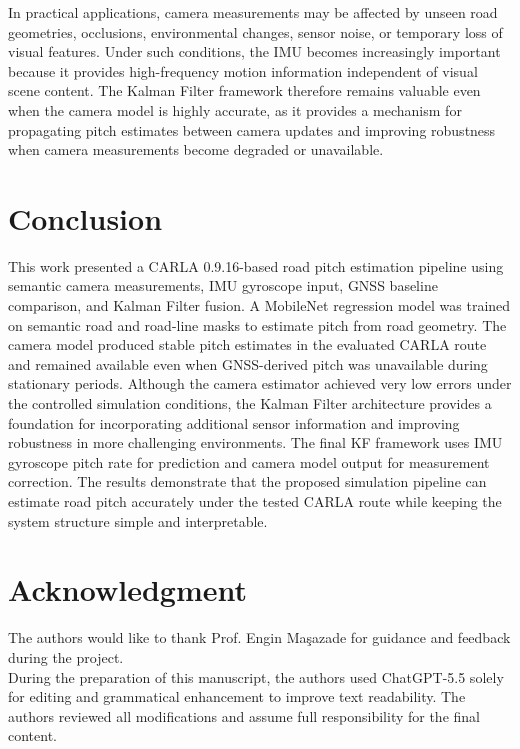 \documentclass[conference]{IEEEtran}
\begin{document}
In practical applications, camera measurements may be affected by unseen road geometries, occlusions, environmental changes, sensor noise, or temporary loss of visual features. Under such conditions, the IMU becomes increasingly important because it provides high-frequency motion information independent of visual scene content. The Kalman Filter framework therefore remains valuable even when the camera model is highly accurate, as it provides a mechanism for propagating pitch estimates between camera updates and improving robustness when camera measurements become degraded or unavailable.

\section{Conclusion}
This work presented a CARLA 0.9.16-based road pitch estimation pipeline using semantic camera measurements, IMU gyroscope input, GNSS baseline comparison, and Kalman Filter fusion. A MobileNet regression model was trained on semantic road and road-line masks to estimate pitch from road geometry. The camera model produced stable pitch estimates in the evaluated CARLA route and remained available even when GNSS-derived pitch was unavailable during stationary periods. Although the camera estimator achieved very low errors under the controlled simulation conditions, the Kalman Filter architecture provides a foundation for incorporating additional sensor information and improving robustness in more challenging environments. The final KF framework uses IMU gyroscope pitch rate for prediction and camera model output for measurement correction. The results demonstrate that the proposed simulation pipeline can estimate road pitch accurately under the tested CARLA route while keeping the system structure simple and interpretable.

\section{Acknowledgment}
The authors would like to thank Prof. Engin Maşazade
for guidance and feedback during the project.\\

During the preparation of this manuscript, the authors used ChatGPT-5.5 solely for editing and grammatical enhancement to improve text readability. The authors reviewed all modifications and assume full responsibility for the final content.


\end{document}
